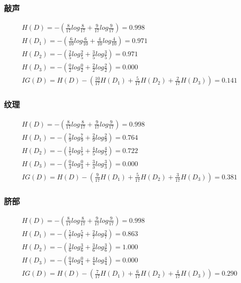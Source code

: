 \documentclass[12pt,a4paper]{article}
\begin{document}
\subsubsection*{敲声}
\begin{center}
    \begin{align*}
         & H(D) = -(\frac{8}{17}log\frac{8}{17}+\frac{9}{17}log\frac{9}{17}) = 0.998          \\
         & H(D_1) = -(\frac{6}{10}log\frac{6}{10}+\frac{4}{10}log\frac{4}{10}) = 0.971        \\
         & H(D_2) = -(\frac{2}{5}log\frac{2}{5}+\frac{3}{5}log\frac{3}{5}) = 0.971            \\
         & H(D_3) = -(\frac{0}{2}log\frac{0}{2}+\frac{2}{2}log\frac{2}{2}) = 0.000            \\
         & IG(D) = H(D) - (\frac{10}{17}H(D_1)+\frac{5}{17}H(D_2)+\frac{2}{17}H(D_3)) = 0.141
    \end{align*}
\end{center}
\subsubsection*{纹理}
\begin{center}
    \begin{align*}
         & H(D) = -(\frac{8}{17}log\frac{8}{17}+\frac{9}{17}log\frac{9}{17}) = 0.998         \\
         & H(D_1) = -(\frac{7}{9}log\frac{7}{9}+\frac{2}{9}log\frac{2}{9}) = 0.764           \\
         & H(D_2) = -(\frac{1}{5}log\frac{1}{5}+\frac{4}{5}log\frac{4}{5}) = 0.722           \\
         & H(D_3) = -(\frac{0}{3}log\frac{0}{3}+\frac{3}{3}log\frac{3}{3}) = 0.000           \\
         & IG(D) = H(D) - (\frac{9}{17}H(D_1)+\frac{5}{17}H(D_2)+\frac{3}{17}H(D_3)) = 0.381
    \end{align*}
\end{center}
\subsubsection*{脐部}
\begin{center}
    \begin{align*}
         & H(D) = -(\frac{8}{17}log\frac{8}{17}+\frac{9}{17}log\frac{9}{17}) = 0.998         \\
         & H(D_1) = -(\frac{5}{7}log\frac{5}{7}+\frac{2}{7}log\frac{2}{7}) = 0.863           \\
         & H(D_2) = -(\frac{3}{6}log\frac{3}{6}+\frac{3}{6}log\frac{3}{6}) = 1.000           \\
         & H(D_3) = -(\frac{0}{4}log\frac{0}{4}+\frac{4}{4}log\frac{4}{4}) = 0.000           \\
         & IG(D) = H(D) - (\frac{7}{17}H(D_1)+\frac{6}{17}H(D_2)+\frac{4}{17}H(D_3)) = 0.290
    \end{align*}
\end{center}
\end{document}

